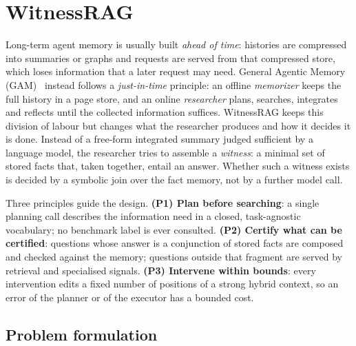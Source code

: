 
\section{WitnessRAG}\label{sec:method}

Long-term agent memory is usually built \emph{ahead of time}: histories are
compressed into summaries or graphs and requests are served from that
compressed store, which loses information that a later request may need.
General Agentic Memory (GAM)~\cite{yan2025gam} instead follows a
\emph{just-in-time} principle: an offline \emph{memorizer} keeps the full
history in a page store, and an online \emph{researcher} plans, searches,
integrates and reflects until the collected information suffices.
WitnessRAG keeps this division of labour but changes what the researcher
produces and how it decides it is done. Instead of a free-form integrated
summary judged sufficient by a language model, the researcher tries to
assemble a \emph{witness}: a minimal set of stored facts that, taken together,
entail an answer. Whether such a witness exists is decided by a symbolic join
over the fact memory, not by a further model call.

Three principles guide the design.
\textbf{(P1) Plan before searching}: a single planning call describes the
information need in a closed, task-agnostic vocabulary; no benchmark label is
ever consulted.
\textbf{(P2) Certify what can be certified}: questions whose answer is a
conjunction of stored facts are composed and checked against the memory;
questions outside that fragment are served by retrieval and specialised
signals.
\textbf{(P3) Intervene within bounds}: every intervention edits a fixed number
of positions of a strong hybrid context, so an error of the planner or of the
executor has a bounded cost.

\subsection{Problem formulation}\label{sec:problem}

